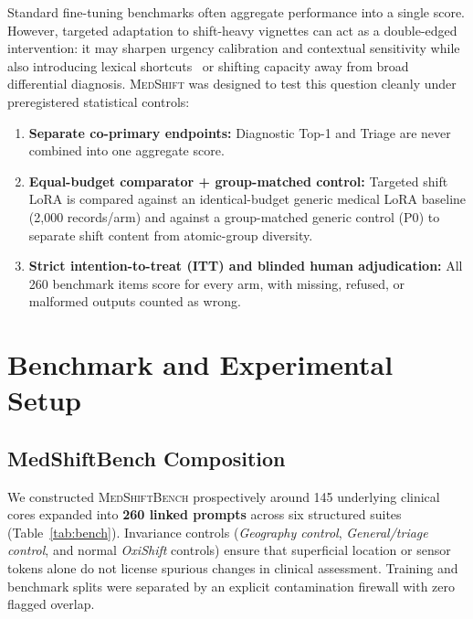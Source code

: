 \documentclass[10pt,twocolumn]{article}
\newcommand{\MedShift}{\textsc{MedShift}}
\begin{document}
Standard fine-tuning benchmarks often aggregate performance into a single score. However, targeted adaptation to shift-heavy vignettes can act as a double-edged intervention: it may sharpen urgency calibration and contextual sensitivity while also introducing lexical shortcuts~\cite{geirhos2020shortcut} or shifting capacity away from broad differential diagnosis. \MedShift{} was designed to test this question cleanly under preregistered statistical controls:
\begin{enumerate}
  \item \textbf{Separate co-primary endpoints:} Diagnostic Top-1 and Triage are never combined into one aggregate score.
  \item \textbf{Equal-budget comparator + group-matched control:} Targeted shift LoRA is compared against an identical-budget generic medical LoRA baseline (2,000 records/arm) and against a group-matched generic control (\textsc{P0}) to separate shift content from atomic-group diversity.
  \item \textbf{Strict intention-to-treat (ITT) and blinded human adjudication:} All 260 benchmark items score for every arm, with missing, refused, or malformed outputs counted as wrong.
\end{enumerate}

\section{Benchmark and Experimental Setup}

\subsection{MedShiftBench Composition}
We constructed \textsc{MedShiftBench} prospectively around 145 underlying clinical cores expanded into \textbf{260 linked prompts} across six structured suites (Table~\ref{tab:bench}). Invariance controls (\emph{Geography control}, \emph{General/triage control}, and normal \emph{OxiShift} controls) ensure that superficial location or sensor tokens alone do not license spurious changes in clinical assessment. Training and benchmark splits were separated by an explicit contamination firewall with zero flagged overlap.
\end{document}
